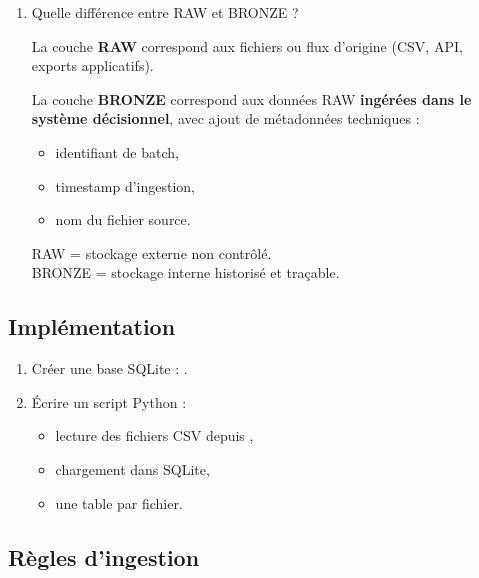 \documentclass[11pt,a4paper]{article}
\begin{document}
\begin{enumerate}
\begin{tcolorbox}[title=\textbf{Correction — Absence de logique métier en BRONZE}, colback=gray!5, colframe=black]
    La couche BRONZE doit rester une \textbf{copie fidèle des données sources}.
    Toute transformation doit être effectuée en couche SILVER ou GOLD.
    \end{tcolorbox}
  \item Quelle différence entre RAW et BRONZE ?
    \begin{tcolorbox}[title=\textbf{Correction — Différence RAW vs BRONZE}, colback=gray!5, colframe=black]
    La couche \textbf{RAW} correspond aux fichiers ou flux d’origine (CSV, API, exports applicatifs).

    La couche \textbf{BRONZE} correspond aux données RAW \textbf{ingérées dans le système décisionnel},
    avec ajout de métadonnées techniques :
    \begin{itemize}
      \item identifiant de batch,
      \item timestamp d’ingestion,
      \item nom du fichier source.
    \end{itemize}

    RAW = stockage externe non contrôlé.\\
    BRONZE = stockage interne historisé et traçable.
    \end{tcolorbox}
\end{enumerate}

\subsection{Implémentation}

\begin{enumerate}
  \item Créer une base SQLite : .
  \item Écrire un script Python  :
  \begin{itemize}
    \item lecture des fichiers CSV depuis ,
    \item chargement dans SQLite,
    \item une table par fichier.
  \end{itemize}
\end{enumerate}

\subsection*{Règles d’ingestion}
\end{document}
